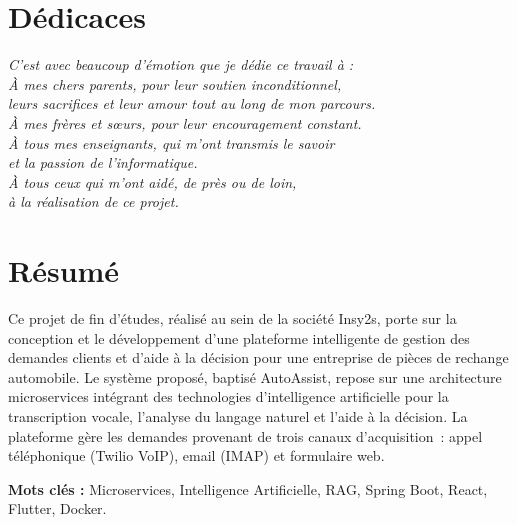 \documentclass[a4paper,12pt]{report}
\begin{document}
\newpage
\thispagestyle{empty}
\chapter*{D\'{e}dicaces}
\vspace*{2cm}
\begin{center}
\textit{C'est avec beaucoup d'\'{e}motion que je d\'{e}die ce travail \`{a} :}\\[1cm]

\textit{\`{A} mes chers parents, pour leur soutien inconditionnel,}\\[0.4cm]
\textit{leurs sacrifices et leur amour tout au long de mon parcours.}\\[0.8cm]

\textit{\`{A} mes fr\`{e}res et s\oe urs, pour leur encouragement constant.}\\[0.8cm]

\textit{\`{A} tous mes enseignants, qui m'ont transmis le savoir}\\[0.4cm]
\textit{et la passion de l'informatique.}\\[0.8cm]

\textit{\`{A} tous ceux qui m'ont aid\'{e}, de pr\`{e}s ou de loin,}\\[0.4cm]
\textit{\`{a} la r\'{e}alisation de ce projet.}
\end{center}

\newpage
\thispagestyle{empty}
\chapter*{R\'{e}sum\'{e}}

Ce projet de fin d'\'{e}tudes, r\'{e}alis\'{e} au sein de la soci\'{e}t\'{e} Insy2s, porte sur la conception et le d\'{e}veloppement d'une plateforme intelligente de gestion des demandes clients et d'aide \`{a} la d\'{e}cision pour une entreprise de pi\`{e}ces de rechange automobile. Le syst\`{e}me propos\'{e}, baptis\'{e} AutoAssist, repose sur une architecture microservices int\'{e}grant des technologies d'intelligence artificielle pour la transcription vocale, l'analyse du langage naturel et l'aide \`{a} la d\'{e}cision. La plateforme g\`{e}re les demandes provenant de trois canaux d'acquisition~: appel t\'{e}l\'{e}phonique (Twilio VoIP), email (IMAP) et formulaire web.

\textbf{Mots cl\'{e}s :} Microservices, Intelligence Artificielle, RAG, Spring Boot, React, Flutter, Docker.
\end{document}

